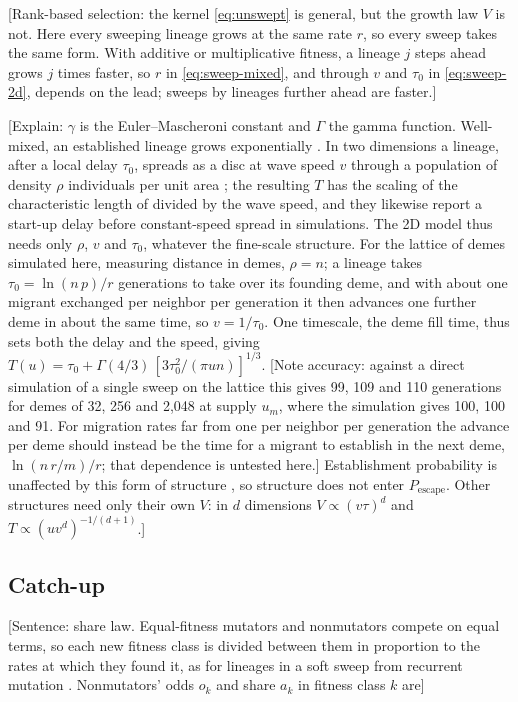 [Rank-based selection: the kernel \cref{eq:unswept} is general, but the growth law $V$ is not. Here every sweeping lineage grows at the same rate $r$, so every sweep takes the same form.
With additive or multiplicative fitness, a lineage $j$ steps ahead grows $j$ times faster, so $r$ in \cref{eq:sweep-mixed}, and through $v$ and $\tau_0$ in \cref{eq:sweep-2d}, depends on the lead; sweeps by lineages further ahead are faster.]

[Explain: $\gamma$ is the Euler--Mascheroni constant and $\Gamma$ the gamma function.
Well-mixed, an established lineage grows exponentially \citep{desai2007beneficial}.
In two dimensions a lineage, after a local delay $\tau_0$, spreads as a disc at wave speed $v$ through a population of density $\rho$ individuals per unit area \citep{fisher1937wave}; the resulting $T$ has the scaling of the characteristic length of \citet{ralph2010parallel} divided by the wave speed, and they likewise report a start-up delay before constant-speed spread in simulations.
The 2D model thus needs only $\rho$, $v$ and $\tau_0$, whatever the fine-scale structure.
For the lattice of demes simulated here, measuring distance in demes, $\rho = n$; a lineage takes $\tau_0 = \ln(n\, p) / r$ generations to take over its founding deme, and with about one migrant exchanged per neighbor per generation it then advances one further deme in about the same time, so $v = 1 / \tau_0$. One timescale, the deme fill time, thus sets both the delay and the speed, giving $T(u) = \tau_0 + \Gamma(4/3)\,[3 \tau_0^2 / (\pi u n)]^{1/3}$. [Note accuracy: against a direct simulation of a single sweep on the lattice this gives 99, 109 and 110 generations for demes of 32, 256 and 2{,}048 at supply $u_m$, where the simulation gives 100, 100 and 91. For migration rates far from one per neighbor per generation the advance per deme should instead be the time for a migrant to establish in the next deme, $\ln(n\, r / m) / r$; that dependence is untested here.]
Establishment probability is unaffected by this form of structure \citep{maruyama1970fixation}, so structure does not enter $P_\mathrm{escape}$.
Other structures need only their own $V$: in $d$ dimensions $V \propto (v \tau)^d$ and $T \propto (u v^d)^{-1/(d+1)}$.]

\subsection{Catch-up} \label{sec:model:catchup}

[Sentence: share law. Equal-fitness mutators and nonmutators compete on equal terms, so each new fitness class is divided between them in proportion to the rates at which they found it, as for lineages in a soft sweep from recurrent mutation \citep{pennings2006soft}.
Nonmutators' odds $o_k$ and share $a_k$ in fitness class $k$ are]

